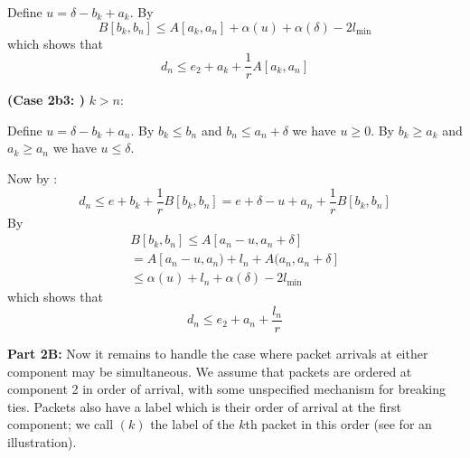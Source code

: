 Define $u= \delta -b_k + a_k$. By 
$$B[b_k,b_n] \leq A[a_k,a_n]+ \alpha(u) +\alpha(\delta) -2 l_{\min}
$$
which shows that
$$
d_n \leq e_2 + a_k +\frac{1}{r}A[a_k, a_n]
$$

\textbf{(Case 2b3: )} $k >n$:

Define $u=\delta - b_k + a_n$. By $b_k \leq b_n$ and $b_n \leq
a_n + \delta$ we have $u \geq 0$. By $b_k \geq a_k$ and $a_k
\geq a_n$ we have $u \leq \delta$.

Now by :
$$
 d_n \leq e+ b_k + \frac{1}{r} B[b_k, b_n]
 = e + \delta - u + a_n +  \frac{1}{r} B[b_k, b_n]
$$
By 
$$
  \begin{array}{l}
    B[b_k, b_n] \leq A[a_n -u , a_n +
 \delta]\\
   =A[a_n -u , a_n) + l_n + A(a_n,a_n +
 \delta]\\
 \leq \alpha(u) + l_n + \alpha(\delta) -2 l_{\min}
  \end{array}
$$
which shows that
$$
d_n \leq e_2 + a_n + \frac{l_n}{r}
$$

\textbf{Part 2B:}
Now it remains to handle the case where packet arrivals at
either component may be simultaneous. We assume that packets
are ordered at component 2 in order of arrival, with some
unspecified mechanism for breaking ties. Packets also have a
label which is their order of arrival at the first component;
we call $(k)$ the label of the $k$th packet in this order (see
 for an illustration).

